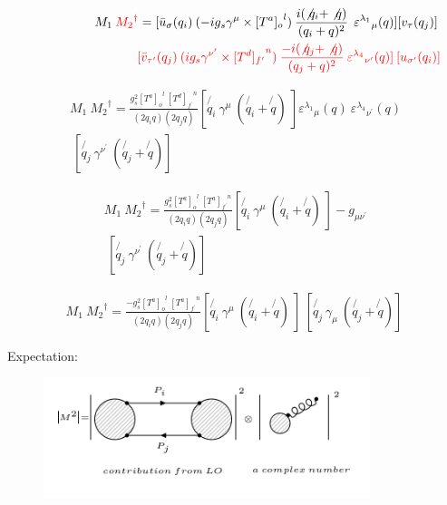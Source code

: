 \begin{equation}
\begin{split}
M_1\:{\color[RGB]{255,0,0} {M_2}^{\dagger}} = [{\bar{u}}_{\sigma}(q_i)\: (-ig_s \gamma^{\mu}\times {[T^a]_o}^l) \: \frac{i(\not{q_i} + \not{q})}{(q_i + q)^2}\:\: {\varepsilon^{\lambda_1}}_{\mu} (q)] [{v}_{\tau}(q_j)]\: \\
\quad\quad\quad\quad\quad\quad\quad\quad\:\:{\color[RGB]{255,0,0}[\bar{v}_{{\tau}^{\prime}}(q_j) \: (ig_s \gamma^{{\nu}^{\prime}}\times {[T^d]_{f^{\prime}}}^n) \: \frac{-i(\not{q_j} + \not{q})}{(q_j + q)^2} \: {\varepsilon^{\lambda_4}}_{{\nu}^{\prime}} (q)]\: [{u}_{{\sigma}^{\prime}}(q_i)]}
\end{split}
\end{equation}



\begin{equation}
\begin{split}
M_1\: {M_2}^{\dagger} = \frac{g_s^2 {[T^a]_o}^l \:{[T^d]_{f^{\prime}}}^n }{(2q_i q)(2q_j q)} [\not{q_i}\: \gamma^{\mu} \: (\not{q_i} + \not{q})\: ]{\varepsilon^{\lambda_1}}_{\mu} (q) \: {\varepsilon^{\lambda_4}}_{{\nu}^{\prime}} (q) \\
\:[\not{q_j} \:\gamma^{{\nu}^{\prime}} \: (\not{q_j} + \not{q})]\:
\end{split}
\end{equation}

\begin{equation}
\begin{split}
M_1\: {M_2}^{\dagger} = \frac{g_s^2 {[T^a]_o}^l \:{[T^a]_{f^{\prime}}}^n }{(2q_i q)(2q_j q)} [\not{q_i}\: \gamma^{\mu} \: (\not{q_i} + \not{q})\: ] -g_{{\mu}{{\nu}^{\prime}}} \\
\:[\not{q_j} \:\gamma^{{\nu}^{\prime}} \: (\not{q_j} + \not{q})]\:
\end{split}
\end{equation}



\begin{equation}
\begin{split}
M_1\: {M_2}^{\dagger} = \frac{-g_s^2 {[T^a]_o}^l \:{[T^a]_{f^{\prime}}}^n }{(2q_i q)(2q_j q)} [\not{q_i}\: \gamma^{\mu} \: (\not{q_i} + \not{q})\: ]
\:[\not{q_j} \:\gamma_{\mu} \: (\not{q_j} + \not{q})]\:
\end{split}
\end{equation}

Expectation:
\begin{figure}[h!]
\centering
\includegraphics[width=0.85\textwidth]{images/expectationM1M2dagger.png}
\end{figure}


